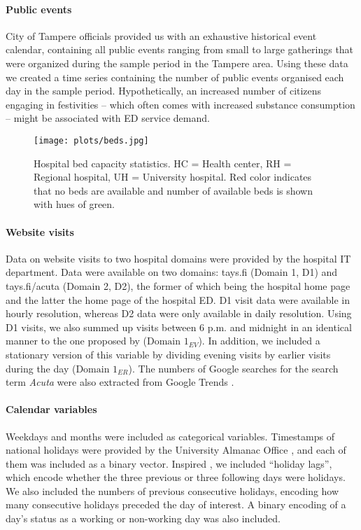 \paragraph{Public events} City of Tampere officials provided us with an exhaustive historical event calendar, containing all public events ranging from small to large gatherings that were organized during the sample period in the Tampere area. Using these data we created a time series containing the number of public events organised each day in the sample period. Hypothetically, an increased number of citizens engaging in festivities – which often comes with increased substance consumption – might be associated with ED service demand.

\begin{figure}[H]
	\centering
	\texttt{[image: plots/beds.jpg]}
	\caption{Hospital bed capacity statistics. HC = Health center, RH = Regional hospital, UH = University hospital. Red color indicates that no beds are available and number of available beds is shown with hues of green.}
	\label{fig:beds}
\end{figure}

\paragraph{Website visits} Data on website visits to two hospital domains were provided by the hospital IT department. Data were available on two domains: tays.fi (Domain 1, D1) and tays.fi/acuta (Domain 2, D2), the former of which being the hospital home page and the latter the home page of the hospital ED. D1 visit data were available in hourly resolution, whereas D2 data were only available in daily resolution. Using D1 visits, we also summed up visits between 6 p.m. and midnight in an identical manner to the one proposed by \citet{Ekstrom2015} ($\text{Domain 1}_{EV}$). In addition, we included a stationary version of this variable by dividing evening visits by earlier visits during the day ($\text{Domain 1}_{ER}$). The numbers of Google searches for the search term \emph{Acuta} were also extracted from Google Trends \cite{GoogleTrends}.

\paragraph{Calendar variables} Weekdays and months were included as categorical variables. Timestamps of national holidays were provided by the University Almanac Office \cite{AlmanacOffice}, and each of them was included as a binary vector. Inspired \citet{Whitt2019}, we included “holiday lags”, which encode whether the three previous or three following days were holidays. We also included the numbers of previous consecutive holidays, encoding how many consecutive holidays preceded the day of interest. A binary encoding of a day’s status as a working or non-working day was also included.

